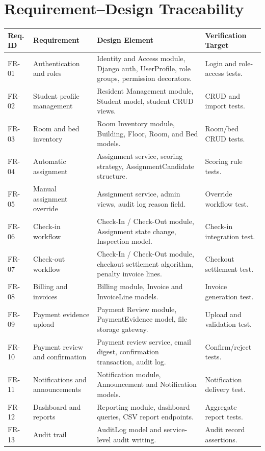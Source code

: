 \documentclass[11pt,a4paper]{article}
\begin{document}
\section{Requirement--Design Traceability}

\begin{longtable}{L{0.10\textwidth} L{0.25\textwidth} L{0.37\textwidth} L{0.17\textwidth}}
\toprule
\textbf{Req. ID} & \textbf{Requirement} & \textbf{Design Element} & \textbf{Verification Target}\\
\midrule
\endhead
FR-01 & Authentication and roles & Identity and Access module, Django auth, UserProfile, role groups, permission decorators. & Login and role-access tests.\\
FR-02 & Student profile management & Resident Management module, Student model, student CRUD views. & CRUD and import tests.\\
FR-03 & Room and bed inventory & Room Inventory module, Building, Floor, Room, and Bed models. & Room/bed CRUD tests.\\
FR-04 & Automatic assignment & Assignment service, scoring strategy, AssignmentCandidate structure. & Scoring rule tests.\\
FR-05 & Manual assignment override & Assignment service, admin views, audit log reason field. & Override workflow test.\\
FR-06 & Check-in workflow & Check-In / Check-Out module, Assignment state change, Inspection model. & Check-in integration test.\\
FR-07 & Check-out workflow & Check-In / Check-Out module, checkout settlement algorithm, penalty invoice lines. & Checkout settlement test.\\
FR-08 & Billing and invoices & Billing module, Invoice and InvoiceLine models. & Invoice generation test.\\
FR-09 & Payment evidence upload & Payment Review module, PaymentEvidence model, file storage gateway. & Upload and validation test.\\
FR-10 & Payment review and confirmation & Payment review service, email digest, confirmation transaction, audit log. & Confirm/reject tests.\\
FR-11 & Notifications and announcements & Notification module, Announcement and Notification models. & Notification delivery test.\\
FR-12 & Dashboard and reports & Reporting module, dashboard queries, CSV report endpoints. & Aggregate report tests.\\
FR-13 & Audit trail & AuditLog model and service-level audit writing. & Audit record assertions.\\

\end{longtable}
\end{document}
